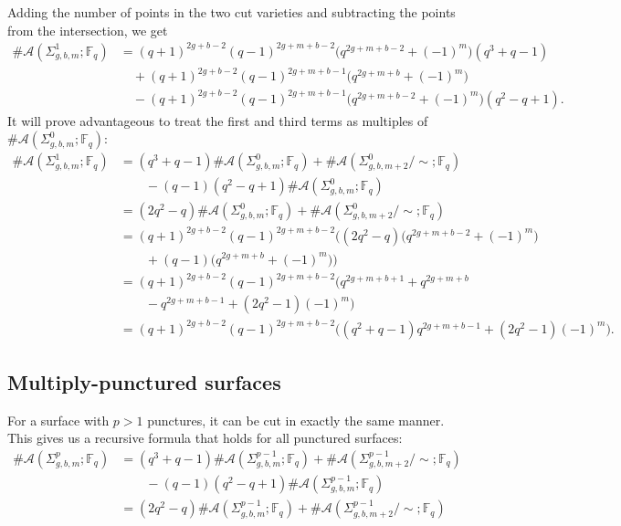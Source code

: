 \documentclass[reqno,12pt]{amsart}
\theoremstyle{definition}
\theoremstyle{remark}
\theoremstyle{remark}
\numberwithin{equation}{section}
\begin{document}
Adding the number of points in the two cut varieties and subtracting the points from the intersection, we get 
\begin{align*}
    \#\mathcal{A}(\Sigma_{g,b,m}^1; \mathbb{F}_q) &= (q+1)^{2g+b-2}(q-1)^{2g+m+b-2}\big(q^{2g+m+b-2} + (-1)^{m}\big)(q^3+q-1) \\
    &\phantom{00}+ (q+1)^{2g+b-2}(q-1)^{2g+m+b-1}\big(q^{2g+m+b} + (-1)^{m}\big) \\
    &\phantom{00}- (q+1)^{2g+b-2}(q-1)^{2g+m+b-1}\big(q^{2g+m+b-2} + (-1)^{m}\big)(q^2-q+1).
\end{align*}
It will prove advantageous to treat the first and third terms as multiples of $\#\mathcal{A}(\Sigma_{g,b,m}^0; \mathbb{F}_q)$:
\begin{align*}
    \#\mathcal{A}(\Sigma_{g,b,m}^1; \mathbb{F}_q) &= (q^3+q-1) \#\mathcal{A}(\Sigma_{g,b,m}^0; \mathbb{F}_q) + \#\mathcal{A}(\Sigma_{g,b,m+2}^0/\!\sim; \mathbb{F}_q) \\ &\quad\quad - (q-1)(q^2-q+1) \#\mathcal{A}(\Sigma_{g,b,m}^0; \mathbb{F}_q) \\
    &= (2q^2-q) \#\mathcal{A}(\Sigma_{g,b,m}^0; \mathbb{F}_q) + \#\mathcal{A}(\Sigma_{g,b,m+2}^0/\!\sim; \mathbb{F}_q) \\
    &= (q+1)^{2g+b-2} (q-1)^{2g+m+b-2} \big((2q^2-q)\big(q^{2g+m+b-2} + (-1)^{m}\big) \\ &\quad\quad  + (q-1)\big(q^{2g+m+b} + (-1)^{m}\big) \big) \\
    &= (q+1)^{2g+b-2} (q-1)^{2g+m+b-2} \big(q^{2g+m+b+1} + q^{2g+m+b}  \\ &\quad\quad  - q^{2g+m+b-1} + (2q^2-1)(-1)^{m} \big) \\
    &= (q+1)^{2g+b-2} (q-1)^{2g+m+b-2} \big((q^2 + q - 1)q^{2g+m+b-1} + (2q^2-1)(-1)^{m} \big).
\end{align*}

\subsection{Multiply-punctured surfaces}

For a surface with $p>1$ punctures, it can be cut in exactly the same manner. This gives us a recursive formula that holds for all punctured surfaces:
\begin{align*}
    \#\mathcal{A}(\Sigma_{g,b,m}^p; \mathbb{F}_q) &= (q^3+q-1) \#\mathcal{A}(\Sigma_{g,b,m}^{p-1}; \mathbb{F}_q) + \#\mathcal{A}(\Sigma_{g,b,m+2}^{p-1}/\!\sim; \mathbb{F}_q) \\ &\quad\quad - (q-1)(q^2-q+1) \#\mathcal{A}(\Sigma_{g,b,m}^{p-1}; \mathbb{F}_q) \\
    &= (2q^2-q) \#\mathcal{A}(\Sigma_{g,b,m}^{p-1}; \mathbb{F}_q) + \#\mathcal{A}(\Sigma_{g,b,m+2}^{p-1}/\!\sim; \mathbb{F}_q)
\end{align*}
\end{document}
